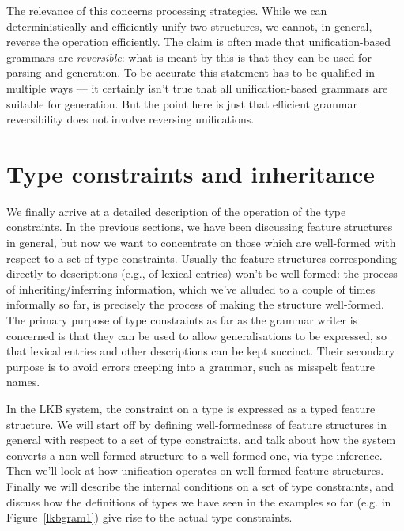 \documentclass[12pt]{report}
\newcommand{\newterm}[1]{{\it #1}}
\begin{document}
\begin{enumerate}
The relevance of this concerns
processing strategies.  While we can deterministically
and efficiently unify two structures, we cannot, in general, reverse
the operation efficiently.  The claim is
often made that unification-based grammars are \newterm{reversible}: 
what is meant by this is that
they can be used for parsing and generation.  To be accurate this
statement has to be qualified in multiple ways --- it certainly
isn't true that all unification-based grammars are suitable for
generation.  But the point here is just that efficient
grammar reversibility
does not involve reversing unifications.

\end{enumerate}

\section{Type constraints and inheritance}
\label{easycons}

We finally arrive at a detailed description of the operation of
the type constraints.  In the previous sections, we have been discussing
feature structures in general, but now we want to concentrate
on those which are well-formed with respect to a set
of type constraints.
Usually the feature structures
corresponding directly
to descriptions (e.g., of lexical entries) won't
be well-formed: the process of inheriting/inferring information, which we've
alluded to a couple of times informally so far, is precisely the
process of making the structure well-formed. 
The primary purpose of type constraints as far as the grammar
writer is concerned is that they can be used to allow generalisations
to be expressed, so that lexical entries and other descriptions
can be kept
succinct.  Their secondary purpose is to avoid errors
creeping into a grammar, such as misspelt feature names.

In the LKB system, the constraint on a type is 
expressed as a typed feature structure.
We will start off by defining well-formedness of feature structures
in general
with respect to a set of type constraints, and talk about 
how the system converts a non-well-formed structure to a well-formed one,
via type inference.  Then we'll look at how unification
operates on well-formed feature structures.  Finally we will
describe the internal conditions on a set of type constraints,
and discuss how the definitions of types we have seen in the
examples so far (e.g. in Figure~\ref{lkbgram1}) give rise to
the actual type constraints.
\end{document}
